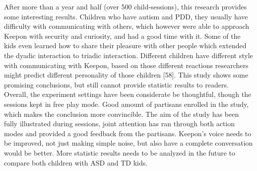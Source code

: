 After more than a year and half (over 500 child-sessions), this research provides some interesting results. Children who have autism and PDD, they usually have difficulty with communicating with others, which however were able to approach Keepon with security and curiosity, and had a good time with it. Some of the kids even learned how to share their pleasure with other people which extended the dyadic interaction to triadic interaction. Different children have different style with communicating with Keepon, based on those different reactions researchers might predict different personality of those children [58].
This study shows some promising conclusions, but still cannot provide statistic results to readers. Overall, the experiment settings have been considerate be thoughtful, though the sessions kept in free play mode. Good amount of partisans enrolled in the study, which makes the conclusion more convincible. The aim of the study has been fully illustrated during sessions, joint attention has ran through both action modes and provided a good feedback from the partisans. Keepon’s voice needs to be improved, not just making simple noise, but also have a complete conversation would be better. More statistic results needs to be analyzed in the future to compare both children with ASD and TD kids.

